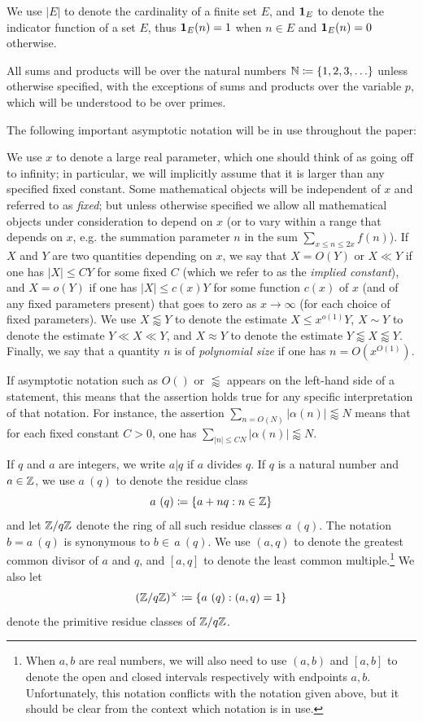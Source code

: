 We use $|E|$ to denote the cardinality of a finite set $E$, and $\mathbf{1}_E$ to denote the indicator function of a set $E$, thus $\mathbf{1}_E(n)=1$ when $n \in E$ and $\mathbf{1}_E(n)=0$ otherwise.  

All sums and products will be over the natural numbers $\mathbb{N} \coloneqq \{1,2,3,\ldots\}$ unless otherwise specified, with the exceptions of sums and products over the variable $p$, which will be understood to be over primes.

The following important asymptotic notation will be in use throughout the paper:

\begin{definition}\label{asym}  We use $x$ to denote a large real parameter, which one should think of as going off to infinity; in particular, we will implicitly assume that it is larger than any specified fixed constant. Some mathematical objects will be independent of $x$ and referred to as \emph{fixed}; but unless otherwise specified we allow all mathematical objects under consideration to depend on $x$ (or to vary within a range that depends on $x$, e.g. the summation parameter $n$ in the sum $\sum_{x \leq n \leq 2x} f(n)$).  If $X$ and $Y$ are two quantities depending on $x$, we say that $X = O(Y)$ or $X \ll Y$ if one has $|X| \leq CY$ for some fixed $C$ (which we refer to as the \emph{implied constant}), and $X = o(Y)$ if one has $|X| \leq c(x) Y$ for some function $c(x)$ of $x$ (and of any fixed parameters present) that goes to zero as $x \to \infty$ (for each choice of fixed parameters).  We use $X \lessapprox Y$ to denote the estimate $X \leq x^{o(1)} Y$, $X \sim Y$ to denote the estimate $Y \ll X \ll Y$, and $X \approx Y$ to denote the estimate $Y \lessapprox X \lessapprox Y$.  Finally, we say that a quantity $n$ is of \emph{polynomial size} if one has $n = O(x^{O(1)})$.

If asymptotic notation such as $O()$ or $\lessapprox$ appears on the left-hand side of a statement, this means that the assertion holds true for any specific interpretation of that notation.  For instance, the assertion $\sum_{n=O(N)} |\alpha(n)| \lessapprox N$ means that for each fixed constant $C>0$, one has $\sum_{|n| \leq CN} |\alpha(n)|\lessapprox N$.
\end{definition}

If $q$ and $a$ are integers, we write $a|q$ if $a$ divides $q$.
If $q$ is a natural number and $a \in \mathbb{Z}$, we use $a\ (q)$ to denote
the residue class
$$ a\ (q) \coloneqq \{ a+nq: n \in \mathbb{Z} \}$$
and let $\mathbb{Z}/q\mathbb{Z}$ denote the ring of all such residue classes $a\
(q)$. The notation $b=a\ (q)$ is synonymous to $b \in \, a \ (q)$. We
use $(a,q)$ to denote the greatest common divisor of $a$ and $q$, and
$[a,q]$ to denote the least common
multiple.\footnote{When $a,b$ are real numbers, we will also
  need to use $(a,b)$ and $[a,b]$ to denote the open and closed
  intervals respectively with endpoints $a,b$.  Unfortunately, this
  notation conflicts with the notation given above, but it should be
  clear from the context which notation is in use.}
We also let
$$ (\mathbb{Z}/q\mathbb{Z})^\times \coloneqq \{ a\ (q): (a,q)=1 \}$$
denote the primitive residue classes of $\mathbb{Z}/q\mathbb{Z}$.  

